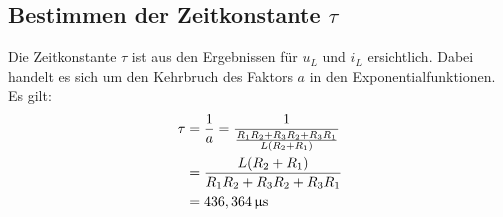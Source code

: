 \documentclass[11pt]{scrartcl}
\begin{document}
\subsection{Bestimmen der Zeitkonstante $\tau$}
Die Zeitkonstante $\tau$ ist aus den Ergebnissen für $u_{L}$ und $i_{L}$ ersichtlich.
Dabei handelt es sich um den Kehrbruch des Faktors $a$ in den Exponentialfunktionen.
Es gilt:
\begin{align}
  \label{eq:tau}
  \begin{split}
    \tau &= \frac{1}{a} = \frac{1}{\frac{R_{1}R_{2} + R_{3}R_{2} + R_{3}R_{1}}{L(R_{2} + R_{1})}} \\
    &= \frac{L(R_{2} + R_{1})}{R_{1}R_{2} + R_{3}R_{2} + R_{3}R_{1}} \\
    &= 436,364 \,\text{$\upmu$s}
  \end{split}
\end{align}
\end{document}
